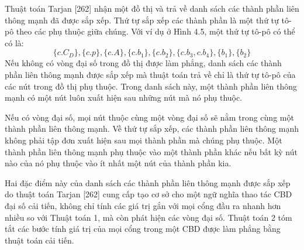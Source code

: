 Thuật toán Tarjan [262] nhận một đồ thị và trả về danh sách các thành phần liên thông mạnh đã được sắp xếp. Thứ tự sắp xếp các thành phần là một thứ tự tô-pô theo các phụ thuộc giữa chúng. Với ví dụ ở Hình 4.5, một thứ tự tô-pô có thể có là:
\[\{c.C_D\},\{c.p\},\{c.A\},\{c.b_1\},\{c.b_2\},\{c.b_3,c.b_4\},\{b_1\},\{b_2\}\]
Nếu không có vòng đại số trong đồ thị được làm phẳng, danh sách các thành phần liên thông mạnh được sắp xếp mà thuật toán trả về chỉ là thứ tự tô-pô của các nút trong đồ thị phụ thuộc. Trong danh sách này, một thành phần liên thông mạnh có một nút luôn xuất hiện sau những nút mà nó phụ thuộc.

Nếu có vòng đại số, mọi nút thuộc cùng một vòng đại số sẽ nằm trong cùng một thành phần liên thông mạnh. Về thứ tự sắp xếp, các thành phần liên thông mạnh không phải tập đơn xuất hiện sau mọi thành phần mà chúng phụ thuộc. Một thành phần liên thông mạnh phụ thuộc vào một thành phần khác nếu bất kỳ nút nào của nó phụ thuộc vào ít nhất một nút của thành phần kia.

Hai đặc điểm này của danh sách các thành phần liên thông mạnh được sắp xếp do thuật toán Tarjan [262] cung cấp tạo cơ sở cho một ngữ nghĩa thao tác CBD đại số cải tiến, không chỉ tính các giá trị gắn với mọi cổng đầu ra nhanh hơn nhiều so với Thuật toán 1, mà còn phát hiện các vòng đại số. Thuật toán 2 tóm tắt các bước tính giá trị của mọi cổng trong một CBD được làm phẳng bằng thuật toán cải tiến.

